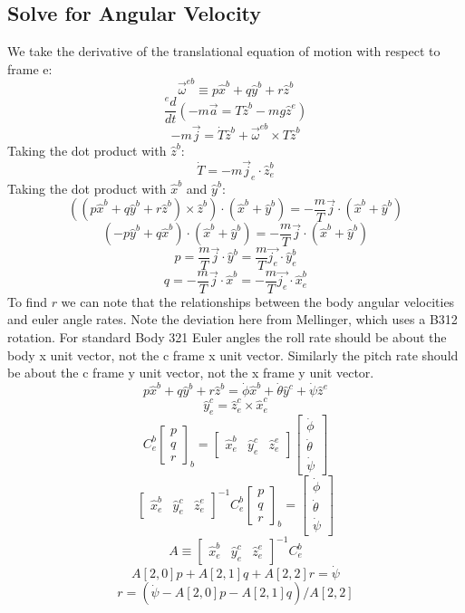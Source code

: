 \documentclass[10pt]{article}
\begin{document}
\subsection{Solve for Angular Velocity}
%
We take the derivative of the translational equation of motion with respect to frame e:
%
$$ \vec{\omega}^{eb} \equiv p \hat{x}^b + q \hat{y}^b + r \hat{z}^b$$
%
$$\dfrac{^ed}{dt}\left(-m\vec{a} = T \hat{z}^b - m g \hat{z}^e\right)$$
%
$$-m\vec{j} = \dot{T} \hat{z}^b + \vec{\omega}^{eb} \times T \hat{z}^b$$
%
Taking the dot product with $\hat{z}^b$:
%
$$\dot{T}= - m\vec{j}_e \cdot \hat{z}^b_e$$
%
Taking the dot product with $\hat{x}^b$ and $\hat{y}^b$:
%
$$\left((p \hat{x}^b + q \hat{y}^b + r \hat{z}^b) \times \hat{z}^b\right) \cdot (\hat{x}^b + \hat{y}^b)  = - \dfrac{m}{T}\vec{j} \cdot (\hat{x}^b + \hat{y}^b)$$
%
$$(-p \hat{y}^b + q \hat{x}^b) \cdot (\hat{x}^b + \hat{y}^b)  = - \dfrac{m}{T}\vec{j} \cdot (\hat{x}^b + \hat{y}^b)$$
%
$$p  =  \dfrac{m}{T}\vec{j} \cdot \hat{y}^b = \dfrac{m}{T}\vec{j_e} \cdot \hat{y}^b_e$$
%
$$q  =  -\dfrac{m}{T}\vec{j} \cdot \hat{x}^b = -\dfrac{m}{T}\vec{j_e} \cdot \hat{x}^b_e$$
%
To find $r$ we can note that the relationships between the body angular velocities and euler angle rates. Note the deviation here from Mellinger, which uses a B312 rotation. For standard Body 321 Euler angles the roll rate should be about the body x unit vector, not the c frame x unit vector. Similarly the pitch rate should be about the c frame y unit vector, not the x frame y unit vector.
%
$$p \hat{x}^b + q \hat{y}^b +  r \hat{z}^b = \dot{\phi} \hat{x}^b + \dot{\theta} \hat{y}^c + \dot{\psi} \hat{z}^e$$
%
$$\hat{y}^c_e = \hat{z}^c_e \times \hat{x}^c_e$$
%
$$C^b_e \begin{bmatrix} p \\ q \\ r \end{bmatrix}_b = \begin{bmatrix} \hat{x}^b_e & \hat{y}^c_e & \hat{z}^e_e\end{bmatrix} \begin{bmatrix} \dot{\phi} \\ \dot{\theta} \\ \dot{\psi} \end{bmatrix}$$
%
$$\begin{bmatrix} \hat{x}^b_e & \hat{y}^c_e & \hat{z}^e_e\end{bmatrix}^{-1} C^b_e \begin{bmatrix} p \\ q \\ r \end{bmatrix}_b =  \begin{bmatrix} \dot{\phi} \\ \dot{\theta} \\ \dot{\psi} \end{bmatrix}$$
%
%
$$A \equiv \begin{bmatrix} \hat{x}^b_e & \hat{y}^c_e & \hat{z}^e_e\end{bmatrix}^{-1} C^b_e $$
%
$$A[2, 0] p +  A[2, 1] q + A[2, 2] r = \dot{\psi}$$
%
$$r = (\dot{\psi} - A[2, 0] p -  A[2, 1] q)/A[2, 2]$$
\end{document}
